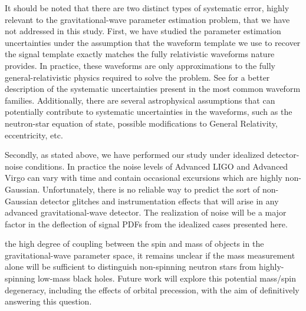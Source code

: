 \documentclass[11pt,a4paper]{emulateapj} 
\begin{document}
It should be noted that there are two distinct types of systematic
error, highly relevant to the gravitational-wave parameter estimation
problem, that we have not addressed in this study.  First, we have
studied the parameter estimation uncertainties under the assumption
that the waveform template we use to recover the signal template
exactly matches the fully relativistic waveforms nature provides.  In
practice, these waveforms are only approximations to the fully
general-relativistic physics required to solve the problem.  See
\cite{BuonannoWaveform} for a better description of the systematic uncertainties
present in the most common waveform families.  Additionally, there are
several astrophysical assumptions that can potentially contribute to
systematic uncertainties in the waveforms, such as the neutron-star
equation of state, possible modifications to General Relativity,
eccentricity, etc.

Secondly, as stated above, we have performed our study under idealized
detector-noise conditions.  In practice the noise levels of Advanced
LIGO and Advanced Virgo can vary with time and contain occasional
excursions which are highly non-Gaussian.  Unfortunately, there is no
reliable way to predict the sort of non-Gaussian detector glitches and
instrumentation effects that will arise in any advanced
gravitational-wave detector.  The realization of noise will be a
major factor in the deflection of signal PDFs from the idealized cases
presented here.

the high degree of coupling between the spin and mass of objects
in the gravitational-wave parameter space, it remains unclear if the
mass measurement alone will be sufficient to distinguish non-spinning
neutron stars from highly-spinning low-mass black holes.  Future work
will explore this potential mass/spin degeneracy, including the
effects of orbital precession, with the aim of definitively answering
this question.

 {}
\end{document}
